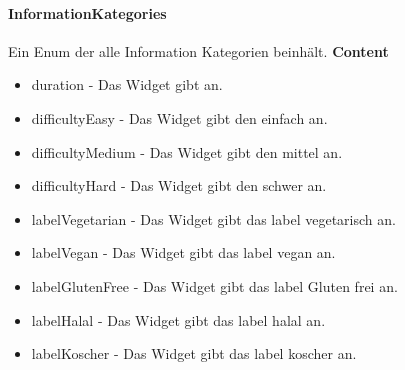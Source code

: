 \documentclass[parskip=full]{scrartcl}
\begin{document}
        \paragraph{InformationKategories}
        Ein Enum der alle Information Kategorien beinhält.
            \textbf{Content}
            \begin{itemize}
                \item duration - Das Widget gibt an.
                \item difficultyEasy - Das Widget gibt den  einfach an.
                \item difficultyMedium - Das Widget gibt den  mittel an.
                \item difficultyHard - Das Widget gibt den  schwer an.
                \item labelVegetarian - Das Widget gibt das \gls{label} vegetarisch an.
                \item labelVegan - Das Widget gibt das \gls{label} vegan an.
                \item labelGlutenFree - Das Widget gibt das \gls{label} Gluten frei an.
                \item labelHalal - Das Widget gibt das \gls{label} halal an.
                \item labelKoscher - Das Widget gibt das \gls{label} koscher an.
            \end{itemize}
            
\end{document}
